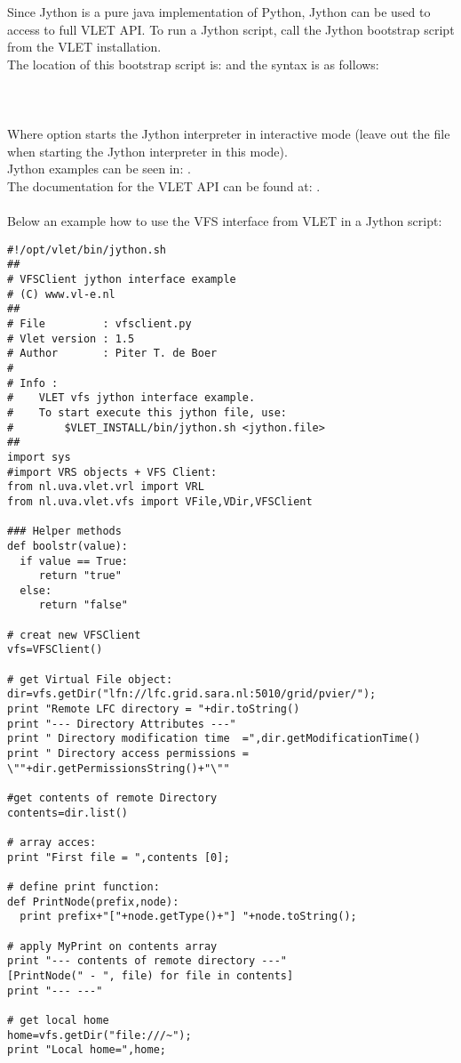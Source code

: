 Since Jython is a pure java implementation of Python, Jython can be used 
to access to full VLET API. To run  a Jython script, call the Jython 
bootstrap script from the VLET installation. \\
The location of this bootstrap script is:  and
the syntax is as follows: \\
\\
\tab {}\\
\\
Where option  starts the Jython interpreter in interactive mode (leave
out the file when starting the Jython interpreter in this mode). \\
Jython examples can be seen in: . 
\\
The documentation for the VLET API can be found at: 
. \\ 
\\ 
Below an example how to use the VFS interface from VLET in a Jython 
script:

\hspace*{5mm}\begin{boxedminipage}{165mm}
\begin{verbatim}
#!/opt/vlet/bin/jython.sh
##
# VFSClient jython interface example
# (C) www.vl-e.nl 
##
# File         : vfsclient.py 
# Vlet version : 1.5
# Author       : Piter T. de Boer 
#
# Info :  
#    VLET vfs jython interface example.
#    To start execute this jython file, use:
#        $VLET_INSTALL/bin/jython.sh <jython.file> 
##
import sys
#import VRS objects + VFS Client: 
from nl.uva.vlet.vrl import VRL
from nl.uva.vlet.vfs import VFile,VDir,VFSClient

### Helper methods
def boolstr(value):
  if value == True: 
     return "true" 
  else:
     return "false" 
     
# creat new VFSClient
vfs=VFSClient()

# get Virtual File object: 
dir=vfs.getDir("lfn://lfc.grid.sara.nl:5010/grid/pvier/"); 
print "Remote LFC directory = "+dir.toString()
print "--- Directory Attributes ---" 
print " Directory modification time  =",dir.getModificationTime()
print " Directory access permissions = \""+dir.getPermissionsString()+"\"" 

#get contents of remote Directory 
contents=dir.list()

# array acces: 
print "First file = ",contents [0];

# define print function: 
def PrintNode(prefix,node):
  print prefix+"["+node.getType()+"] "+node.toString();

# apply MyPrint on contents array
print "--- contents of remote directory ---"
[PrintNode(" - ", file) for file in contents]
print "--- ---"

# get local home 
home=vfs.getDir("file:///~"); 
print "Local home=",home; 
\end{verbatim}
\end{boxedminipage}



